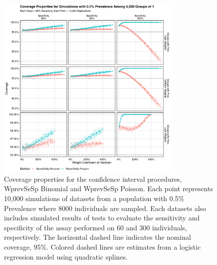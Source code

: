 \documentclass[AMA,STIX1COL]{WileyNJD-v2}
\begin{document}
\begin{figure}
\centering
\includegraphics[width=0.8\textwidth]{figures/imperfect_coverage_8000_groups_0_005_prev.pdf}
\caption{Coverage properties for the confidence interval procedures, WprevSeSp Binomial and WprevSeSp Poisson.
Each point represents 10,000 simulations of datasets from a population with 0.5\% Prevalence where 8000 individuals are sampled.
Each datasets also includes simulated results of tests to evaluate the sensitivity and specificity of the assay performed on 60 and 300 individuals, respectively.
The horizontal dashed line indicates the nominal coverage, 95\%.
Colored dashed lines are estimates from a logistic regression model using quadratic splines.}
\label{fig:imperfect_coverage_8000_groups_0_005_prev}
\end{figure}
\end{document}
